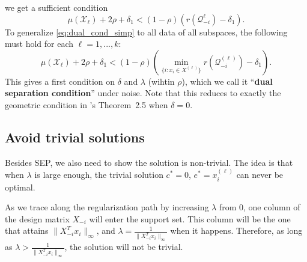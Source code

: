 \documentclass[twoside,11pt]{article}
\numberwithin{equation}{section}
\begin{document}
we get a sufficient condition
\begin{equation}\label{eq:dual_cond_simp}
    \mu(\mathcal{X}_{\ell}) +2\rho +\delta_1< \left(1-\rho\right)(r(\mathcal{Q}_{-i}^{\ell})-\delta_1).
\end{equation}
To generalize \eqref{eq:dual_cond_simp} to all data of all subspaces, the following must hold for each $\ell = 1,...,k$:
\begin{equation}\label{eq:Thm1_all}
    \mu(\mathcal{X}_{\ell}) +2\rho+\delta_1 < \left(1-\rho\right)\left(\min_{\{i: x_i\in X^{(\ell)}\}}r(\mathcal{Q}^{(\ell)}_{-i})-\delta_1\right).
\end{equation}
This gives a first condition on $\delta$ and $\lambda$ (wihtin $\rho$), which we call it ``\textbf{dual separation condition}'' under noise. Note that this reduces to exactly the geometric condition in \citet{soltanolkotabi2011geometric}'s Theorem~2.5 when $\delta=0$.


\subsection{Avoid trivial solutions}\label{sec:avoid_trivial}
Besides SEP, we also need to show the solution is non-trivial. The idea is that when $\lambda$ is large enough, the trivial solution $c^* = 0$, $e^*=x_i^{(\ell)}$ can never be optimal.

As we trace along the regularization path by increasing $\lambda$ from $0$, one column of the design matrix $X_{-i}$ will enter the support set. This column will be the one that attains $\|X_{-i}^Tx_i\|_{\infty}$, and $\lambda = \frac{1}{\|X_{-i}^Tx_i\|_{\infty}}$ when it happens. Therefore, as long as $\lambda> \frac{1}{\|X_{-i}^Tx_i\|_{\infty}}$, the solution will not be trivial.
\end{document}
